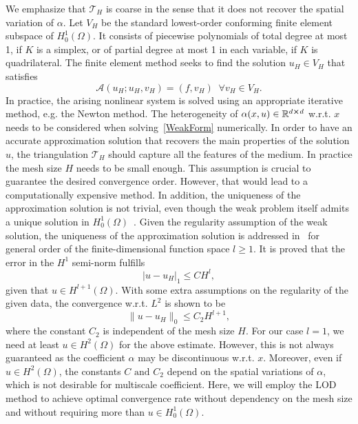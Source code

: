 \documentclass{article}
\begin{document}
We emphasize that $\mathcal{T}_H$ is coarse in the sense that it does not recover the spatial variation of $\alpha$. Let $V_H$ be the standard lowest-order conforming finite element subspace of $H^1_0(\Omega)$. It consists of piecewise polynomials of total degree at most 1, if $K$ is a simplex,  or of partial degree at most 1 in each variable, if $K$ is quadrilateral. 
The finite element method seeks to find the solution $u_H \in V_H$ that satisfies \[\mathcal{A}(u_H;u_H,v_H)=(f,v_H) \;\; \forall v_H \in V_H.\]
In practice, the arising nonlinear system is solved using an appropriate iterative method, e.g. the Newton method. The heterogeneity of $\alpha(x,u) \in \mathbb{R}^{d\cross d}$ w.r.t. $x$ needs to be considered when solving~\eqref{WeakForm} numerically. In order to have an accurate approximation solution that recovers the main properties of the solution $u$, the triangulation $\mathcal{T}_H$ should capture all the features of the medium. In practice the mesh size $H$ needs to be small enough. This assumption is crucial to guarantee the desired convergence order. However, that would lead to a computationally expensive method. In addition, the uniqueness of the approximation solution is not trivial, even though the weak problem itself admits a unique solution in $H^1_0(\Omega)$~\cite{uniqandnotunique}. Given the regularity assumption of the weak solution, the uniqueness of the approximation solution is addressed in~\cite{FEMQuad} for general order of the finite-dimensional function space $l\geq 1$. 
It is proved that the error in the $H^1$ semi-norm fulfills \[|u-u_H|_1 \leq C H^l,\]
given that $u \in H^{l+1}(\Omega)$. With some extra assumptions on the regularity of the given data, the convergence w.r.t. $L^2$ is shown to be \[\|u-u_H\|_0 \leq C_2 H^{l+1},\] where the constant $C_2$ is independent of the mesh size $H$.
For our case $l=1$, we need at least $u \in H^2(\Omega)$ for the above estimate. However, this is not always guaranteed as the coefficient $\alpha$ may be discontinuous w.r.t. $x$. Moreover, even if $u \in H^2(\Omega)$, the constants $C \text{ and } C_2$ depend on the spatial variations of $\alpha$, which is not desirable for multiscale coefficient. Here, we will employ the LOD method to achieve optimal convergence rate without dependency on the mesh size and without requiring more than $u\in H^1_0(\Omega)$.
\end{document}
